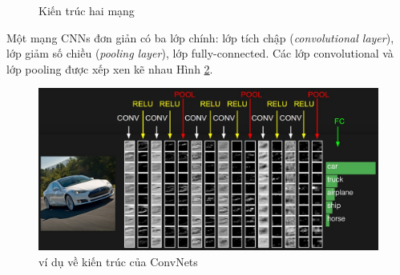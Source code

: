 \begin{center}
\begin{figure}[H]

\begin{center}
  \label{fig:conv}
\caption{Kiến trúc hai mạng}
\end{center}

\end{figure}
\end{center}

Một mạng CNNs đơn giản có ba lớp chính: lớp tích chập (\textit{convolutional layer}), lớp giảm số chiều (\textit{pooling layer}), lớp fully-connected. Các lớp convolutional và lớp pooling được xếp xen kẽ nhau Hình \ref{fig:convNetArch}.
\begin{center}
\begin{figure}[H]
	\begin{center}
		\includegraphics[scale=0.2]{chap3/image/cnn/convnet.jpeg}
	\end{center}
	\caption{ví dụ về kiến trúc của ConvNets}
	
\label{fig:convNetArch}
\end{figure}
\end{center}
